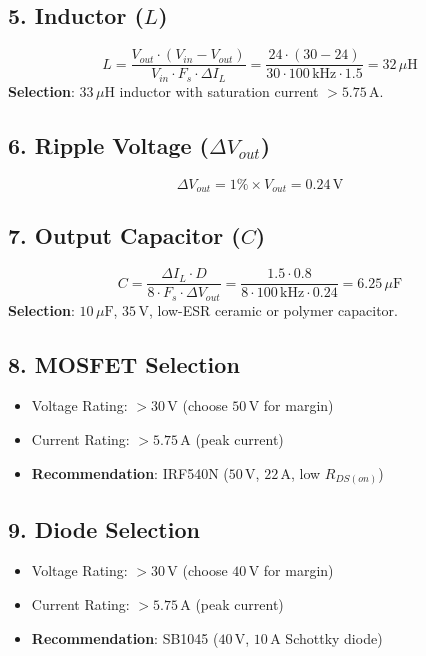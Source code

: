 \documentclass{article}
\begin{document}
\subsection*{5. Inductor (\(L\))}
\[
L = \frac{V_{out} \cdot (V_{in} - V_{out})}{V_{in} \cdot F_s \cdot \Delta I_L} = \frac{24 \cdot (30 - 24)}{30 \cdot 100\,\text{kHz} \cdot 1.5} = 32\,\mu\text{H}
\]
\textbf{Selection}: \(33\,\mu\text{H}\) inductor with saturation current \(> 5.75\,\text{A}\).

\subsection*{6. Ripple Voltage (\(\Delta V_{out}\))}
\[
\Delta V_{out} = 1\% \times V_{out} = 0.24\,\text{V}
\]

\subsection*{7. Output Capacitor (\(C\))}
\[
C = \frac{\Delta I_L \cdot D}{8 \cdot F_s \cdot \Delta V_{out}} = \frac{1.5 \cdot 0.8}{8 \cdot 100\,\text{kHz} \cdot 0.24} = 6.25\,\mu\text{F}
\]
\textbf{Selection}: \(10\,\mu\text{F}\), \(35\,\text{V}\), low-ESR ceramic or polymer capacitor.

\subsection*{8. MOSFET Selection}
\begin{itemize}
    \item Voltage Rating: \(> 30\,\text{V}\) (choose \(50\,\text{V}\) for margin)
    \item Current Rating: \(> 5.75\,\text{A}\) (peak current)
    \item \textbf{Recommendation}: IRF540N (\(50\,\text{V}\), \(22\,\text{A}\), low \(R_{DS(on)}\))
\end{itemize}

\subsection*{9. Diode Selection}
\begin{itemize}
    \item Voltage Rating: \(> 30\,\text{V}\) (choose \(40\,\text{V}\) for margin)
    \item Current Rating: \(> 5.75\,\text{A}\) (peak current)
    \item \textbf{Recommendation}: SB1045 (\(40\,\text{V}\), \(10\,\text{A}\) Schottky diode)
\end{itemize}
\end{document}
